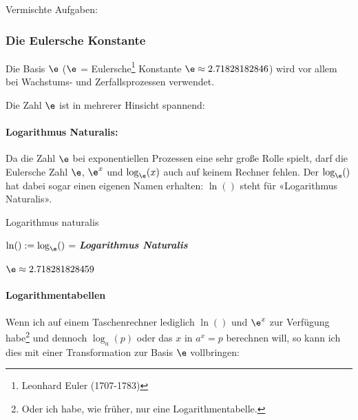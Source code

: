 Vermischte Aufgaben:



\newpage

 




\newpage


\subsubsection{Die Eulersche Konstante}

Die Basis $\e$ ($\e$ = Eulersche\footnote{Leonhard Euler (1707-1783)} Konstante $\e\approx 2.71828182846$) wird vor allem bei Wachstums- und Zerfallsprozessen verwendet.

Die Zahl $\e$ ist in mehrerer Hinsicht spannend:

\paragraph{Logarithmus Naturalis:} Da die
Zahl $\e$ bei exponentiellen Prozessen eine sehr große Rolle spielt,
darf die Eulersche Zahl $\e$, $\e^x$ und $\log_{\e}(x)$ auch auf keinem Rechner fehlen. Der $\log_{\e}()$ hat dabei sogar einen eigenen Namen erhalten:
$\ln()$ steht für «Logarithmus Naturalis».

\begin{definition}{Logarithmus naturalis}{}
  
  $\ln() := \log_{\e}()$ = \textit{\textbf{Logarithmus Naturalis}}

  $\e\approx 2.718281828459$
\end{definition}

\paragraph{Logarithmentabellen}
Wenn ich auf einem Taschenrechner lediglich $\ln()$ und $\e^x$ zur
Verfügung habe\footnote{Oder ich habe, wie früher, nur eine
Logarithmentabelle.} und dennoch $\log_a(p)$ oder das $x$ in $a^x=p$ berechnen will, so kann ich dies mit einer Transformation zur Basis $\e$ vollbringen:

